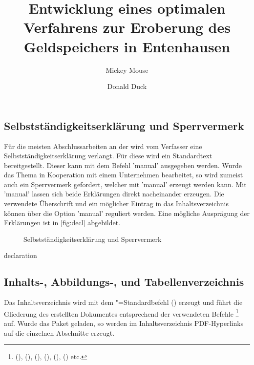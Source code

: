 \documentclass[%
  english,ngerman,%
  cdgeometry=no,DIV=12,automark,%
]{tudscrartcl}
\begin{document}
\subsection{Selbstständigkeitserklärung und Sperrvermerk}
Für die meisten Abschlussarbeiten an der \TnUD wird vom Verfasser eine 
Selbstständigkeitserklärung verlangt. Für diese wird ein Standardtext 
bereitgestellt. Dieser kann mit dem Befehl 'manual' 
ausgegeben werden. Wurde das Thema in Kooperation mit einem Unternehmen 
bearbeitet, so wird zumeist auch ein Sperrvermerk gefordert, welcher mit 
'manual' erzeugt werden kann. Mit 'manual' 
lassen sich beide Erklärungen direkt nacheinander erzeugen. Die verwendete 
Überschrift und ein möglicher Eintrag in das Inhaltsverzeichnis können über die 
Option 'manual' reguliert werden. Eine mögliche Ausprägung 
der Erklärungen ist in \autoref{fig:decl} abgebildet.
%
\begin{figure}
\centering
{}
\caption{Selbstständigkeitserklärung und Sperrvermerk}
\label{fig:decl}
\end{figure}

\begin{Hint!}{declaration}
\title{%
  Entwicklung eines optimalen Verfahrens zur Eroberung des
  Geldspeichers in Entenhausen
}
\author{Mickey Mouse\and Donald Duck}
\declaration[company=FIRMA]
\end{Hint!}
\begin{Trunk+}
\declaration[company=FIRMA]

\end{Trunk+}

\subsection{Inhalts-, Abbildungs-, und Tabellenverzeichnis}
Das Inhaltsverzeichnis wird mit dem "=Standardbefehl 
() erzeugt und führt die Gliederung 
des erstellten Dokumentes entsprechend der verwendeten Befehle%
\footnote{%
  (),
  (), 
  (), 
  (), 
  (),
  () etc.%
}
auf. Wurde das Paket  geladen, so werden im 
Inhaltsverzeichnis PDF-Hyperlinks auf die einzelnen Abschnitte erzeugt.
\end{document}
